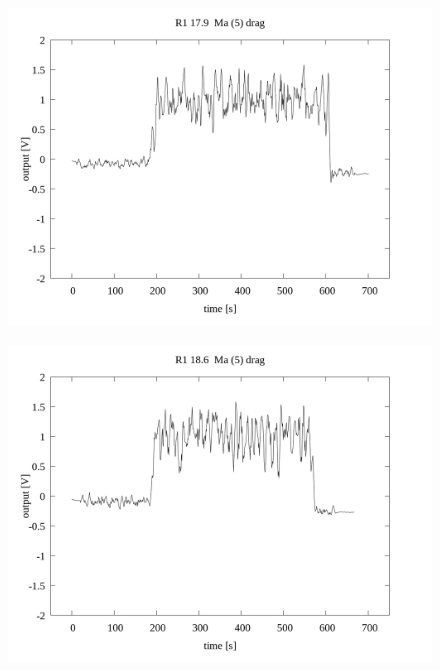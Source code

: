 \documentclass[a4paper]{jsarticle}
\begin{document}
\begin{figure}[htbp]
    \footnotesize
    \begin{center}
        \includegraphics[width=140mm]{../../../../33_result/210806/moving_average/5/drag/01/R1_17.9_ma(5)_drag_01.png}
    \end{center}
\end{figure}

\begin{figure}[htbp]
    \footnotesize
    \begin{center}
        \includegraphics[width=140mm]{../../../../33_result/210806/moving_average/5/drag/01/R1_18.6_ma(5)_drag_01.png}
    \end{center}
\end{figure}
\end{document}
